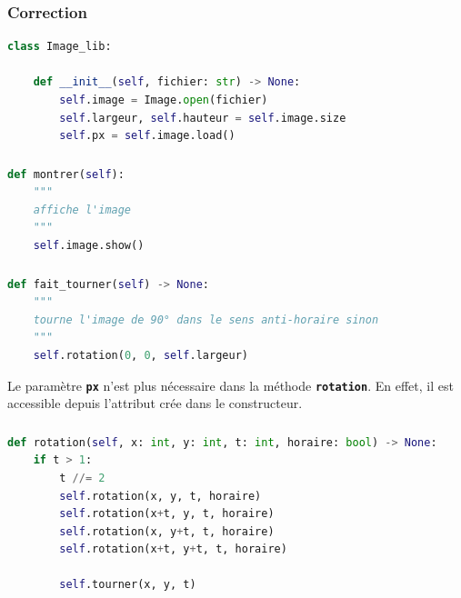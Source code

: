 \documentclass[svgnames,11pt]{beamer}
\begin{document}
\begin{frame}[fragile]
    \frametitle{Correction}

\begin{center}
\begin{lstlisting}[language=Python , basicstyle=\ttfamily\small, xleftmargin=2em, xrightmargin=2em]
class Image_lib:

    def __init__(self, fichier: str) -> None:
        self.image = Image.open(fichier)
        self.largeur, self.hauteur = self.image.size
        self.px = self.image.load()
\end{lstlisting}
\label{CODE}
\end{center}  

\end{frame}
\begin{frame}[fragile]
    \frametitle{}

    \begin{center}
    \begin{lstlisting}[language=Python , basicstyle=\ttfamily\small, xleftmargin=2em, xrightmargin=2em]
def montrer(self):
    """
    affiche l'image
    """
    self.image.show()
\end{lstlisting}
    \label{CODE}
    \end{center}

\end{frame}
\begin{frame}[fragile]
    \frametitle{}

\begin{center}
\begin{lstlisting}[language=Python , basicstyle=\ttfamily\small, xleftmargin=2em, xrightmargin=2em]
def fait_tourner(self) -> None:
    """
    tourne l'image de 90° dans le sens anti-horaire sinon
    """
    self.rotation(0, 0, self.largeur)
\end{lstlisting}
\label{CODE}
\end{center}   
\begin{aretenir}[Remarque]
Le paramètre \textbf{\texttt{px}} n'est plus nécessaire dans la méthode \textbf{\texttt{rotation}}. En effet, il est accessible depuis l'attribut crée dans le constructeur.
\end{aretenir}
\end{frame}
\begin{frame}[fragile]
    \frametitle{}

\begin{center}
\begin{lstlisting}[language=Python , basicstyle=\ttfamily\small, xleftmargin=2em, xrightmargin=2em]
def rotation(self, x: int, y: int, t: int, horaire: bool) -> None:
    if t > 1:
        t //= 2
        self.rotation(x, y, t, horaire)
        self.rotation(x+t, y, t, horaire)
        self.rotation(x, y+t, t, horaire)
        self.rotation(x+t, y+t, t, horaire)

        self.tourner(x, y, t)
\end{lstlisting}
\end{center}

\end{frame}
\end{document}
